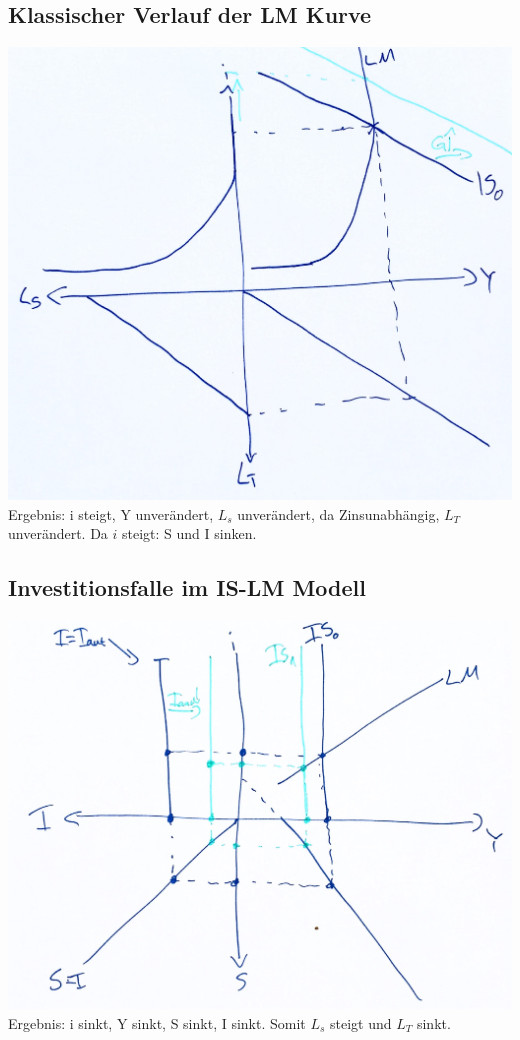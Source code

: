 \documentclass{scrartcl}
\begin{document}
\subsection{Klassischer Verlauf der LM Kurve}
\includegraphics[width=.75\textwidth]{Bilder/Keynes_IS_LM_Klassische_LM_Kurve.pdf}\\
Ergebnis: i steigt, Y unver\"{a}ndert, $L_s$ unver\"{a}ndert, da Zinsunabh\"{a}ngig, $L_T$ unver\"{a}ndert. Da $i$ steigt: S und I sinken.


\subsection{Investitionsfalle im IS-LM Modell}
\includegraphics[width=.75\textwidth]{Bilder/Keynes_IS_LM_Investitionsfalle.pdf}\\
Ergebnis: i sinkt, Y sinkt, S sinkt, I sinkt. Somit $L_s$ steigt und $L_T$ sinkt.
\end{document}
